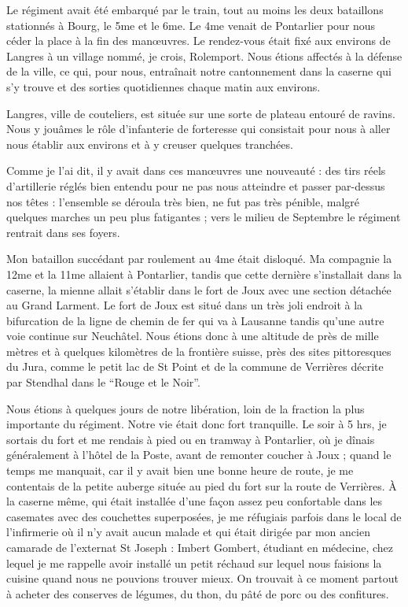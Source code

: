 \documentclass[11pt,a4paper]{report}
\begin{document}
Le régiment avait été embarqué par le train, tout au moins les deux bataillons stationnés à Bourg, le 5me et le 6me. Le 4me venait de Pontarlier pour nous céder la place à la fin des manœuvres. Le rendez-vous était fixé aux environs de Langres à un village nommé, je crois, Rolemport. Nous étions affectés à la défense de la ville, ce qui, pour nous, entraînait notre cantonnement dans la caserne qui s'y trouve et des sorties quotidiennes chaque matin aux environs.

Langres, ville de couteliers, est située sur une sorte de plateau entouré de ravins. Nous y jouâmes le rôle d'infanterie de forteresse qui consistait pour nous à aller nous établir aux environs et à y creuser quelques tranchées.

Comme je l'ai dit, il y avait dans ces manœuvres une nouveauté : des tirs réels d'artillerie réglés bien entendu pour ne pas nous atteindre et passer par-dessus nos têtes : l'ensemble se déroula très bien, ne fut pas très pénible, malgré quelques marches un peu plus fatigantes ; vers le milieu de Septembre le régiment rentrait dans ses foyers.

Mon bataillon succédant par roulement au 4me était disloqué. Ma compagnie la 12me et la 11me allaient à Pontarlier, tandis que cette dernière s'installait dans la caserne, la mienne allait s'établir dans le fort de Joux avec une section détachée au Grand Larment. Le fort de Joux est situé dans un très joli endroit à la bifurcation de la ligne de chemin de fer qui va à Lausanne tandis qu'une autre voie continue sur Neuchâtel. Nous étions donc à une altitude de près de mille mètres et à quelques kilomètres de la frontière suisse, près des sites pittoresques du Jura, comme le petit lac de St Point et de la commune de Verrières décrite par Stendhal dans le ``Rouge et le Noir''.

Nous étions à quelques jours de notre libération, loin de la fraction la plus importante du régiment. Notre vie était donc fort tranquille. Le soir à 5 hrs, je sortais du fort et me rendais à pied ou en tramway à Pontarlier, où je dînais généralement à l'hôtel de la Poste, avant de remonter coucher à Joux ; quand le temps me manquait, car il y avait bien une bonne heure de route, je me contentais de la petite auberge située au pied du fort sur la route de Verrières. À la caserne même, qui était installée d'une façon assez peu confortable dans les casemates avec des couchettes superposées, je me réfugiais parfois dans le local de l'infirmerie où il n'y avait aucun malade et qui était dirigée par mon ancien camarade de l'externat St Joseph : Imbert Gombert, étudiant en médecine, chez lequel je me rappelle avoir installé un petit réchaud sur lequel nous faisions la cuisine quand nous ne pouvions trouver mieux. On trouvait à ce moment partout à acheter des conserves de légumes, du thon, du pâté de porc ou des confitures.
\end{document}
